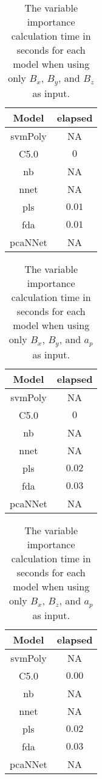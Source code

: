 \begin{table}[!ht]
	\centering
	\begin{tabular}{|c|c|}
		\hline
		Model & elapsed \\ \hline
		svmPoly & NA \\ \hline
		C5.0 & $0$ \\ \hline
		nb & NA \\ \hline
		nnet & NA \\ \hline
		pls & $0.01$ \\ \hline
		fda & $0.01$ \\ \hline
		pcaNNet & NA \\ \hline
	\end{tabular}
	\caption{The variable importance calculation time in seconds for each model when using only $B_{x}$, $B_{y}$, and $B_{z}$ as input.}
	\label{tab:time:coord:importance}
\end{table}

\begin{table}[!ht]
	\centering
	\begin{tabular}{|c|c|}
		\hline
		Model & elapsed \\ \hline
		svmPoly & NA \\ \hline
		C5.0 & $0$ \\ \hline
		nb & NA \\ \hline
		nnet & NA \\ \hline
		pls & $0.02$ \\ \hline
		fda & $0.03$ \\ \hline
		pcaNNet & NA \\ \hline
	\end{tabular}
	\caption{The variable importance calculation time in seconds for each model when using only $B_{x}$, $B_{y}$, and $a_{p}$ as input.}
	\label{tab:time:xyap:importance}
\end{table}

\begin{table}[!ht]
	\centering
	\begin{tabular}{|c|c|}
		\hline
		Model & elapsed \\ \hline
		svmPoly & NA \\ \hline
		C5.0 & $0.00$ \\ \hline
		nb & NA \\ \hline
		nnet & NA \\ \hline
		pls & $0.02$ \\ \hline
		fda & $0.03$ \\ \hline
		pcaNNet & NA \\ \hline
	\end{tabular}
	\caption{The variable importance calculation time in seconds for each model when using only $B_{x}$, $B_{z}$, and $a_{p}$ as input.}
	\label{tab:time:xzap:importance}
\end{table}

